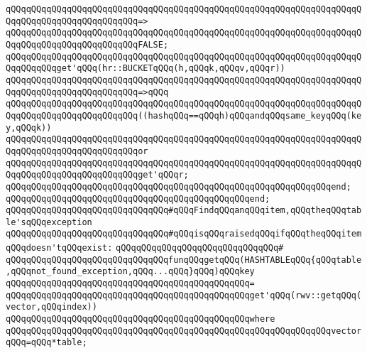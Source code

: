 \verb|qQQqqQQqqQQqqQQqqQQqqQQqqQQqqQQqqQQqqQQqqQQqqQQqqQQqqQQqqQQqqQQqqQQqqQQqqQQqqQQqqQQqqQQqqQQqqQQq=>|\newline
\verb|qQQqqQQqqQQqqQQqqQQqqQQqqQQqqQQqqQQqqQQqqQQqqQQqqQQqqQQqqQQqqQQqqQQqqQQqqQQqqQQqqQQqqQQqqQQqqQQqFALSE;|\newline
\newline
\verb|qQQqqQQqqQQqqQQqqQQqqQQqqQQqqQQqqQQqqQQqqQQqqQQqqQQqqQQqqQQqqQQqqQQqqQQqqQQqqQQqget'qQQq(hr::BUCKETqQQq(h,qQQqk,qQQqv,qQQqr))|\newline
\verb|qQQqqQQqqQQqqQQqqQQqqQQqqQQqqQQqqQQqqQQqqQQqqQQqqQQqqQQqqQQqqQQqqQQqqQQqqQQqqQQqqQQqqQQqqQQqqQQq=>qQQq|\newline
\verb|qQQqqQQqqQQqqQQqqQQqqQQqqQQqqQQqqQQqqQQqqQQqqQQqqQQqqQQqqQQqqQQqqQQqqQQqqQQqqQQqqQQqqQQqqQQqqQQq((hashqQQq==qQQqh)qQQqandqQQqsame_keyqQQq(key,qQQqk))|\newline
\verb|qQQqqQQqqQQqqQQqqQQqqQQqqQQqqQQqqQQqqQQqqQQqqQQqqQQqqQQqqQQqqQQqqQQqqQQqqQQqqQQqqQQqqQQqqQQqqQQqor|\newline
\verb|qQQqqQQqqQQqqQQqqQQqqQQqqQQqqQQqqQQqqQQqqQQqqQQqqQQqqQQqqQQqqQQqqQQqqQQqqQQqqQQqqQQqqQQqqQQqqQQqget'qQQqr;|\newline
\verb|qQQqqQQqqQQqqQQqqQQqqQQqqQQqqQQqqQQqqQQqqQQqqQQqqQQqqQQqqQQqqQQqend;|\newline
\verb|qQQqqQQqqQQqqQQqqQQqqQQqqQQqqQQqqQQqqQQqqQQqqQQqend;|\newline
\newline
\verb|qQQqqQQqqQQqqQQqqQQqqQQqqQQqqQQq#qQQqFindqQQqanqQQqitem,qQQqtheqQQqtable'sqQQqexception|\newline
\verb|qQQqqQQqqQQqqQQqqQQqqQQqqQQqqQQq#qQQqisqQQqraisedqQQqifqQQqtheqQQqitemqQQqdoesn'tqQQqexist:|\newline
\verb|qQQqqQQqqQQqqQQqqQQqqQQqqQQqqQQq#|\newline
\verb|qQQqqQQqqQQqqQQqqQQqqQQqqQQqqQQqfunqQQqgetqQQq(HASHTABLEqQQq{qQQqtable,qQQqnot_found_exception,qQQq...qQQq}qQQq)qQQqkey|\newline
\verb|qQQqqQQqqQQqqQQqqQQqqQQqqQQqqQQqqQQqqQQqqQQqqQQq=|\newline
\verb|qQQqqQQqqQQqqQQqqQQqqQQqqQQqqQQqqQQqqQQqqQQqqQQqget'qQQq(rwv::getqQQq(vector,qQQqindex))|\newline
\verb|qQQqqQQqqQQqqQQqqQQqqQQqqQQqqQQqqQQqqQQqqQQqqQQqwhere|\newline
\newline
\verb|qQQqqQQqqQQqqQQqqQQqqQQqqQQqqQQqqQQqqQQqqQQqqQQqqQQqqQQqqQQqqQQqvectorqQQq=qQQq*table;|\newline
